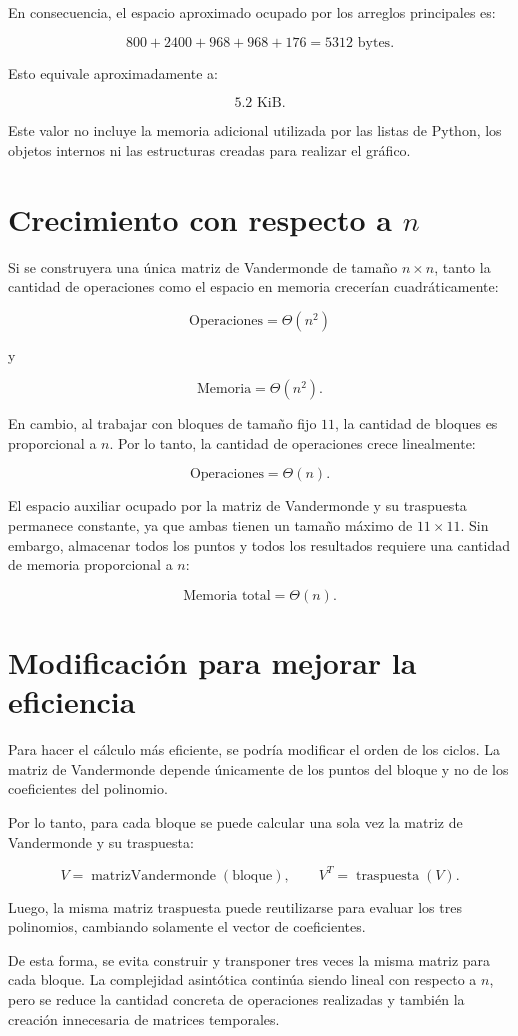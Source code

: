 \documentclass[12pt,a4paper]{article}
\begin{document}
En consecuencia, el espacio aproximado ocupado por los arreglos principales es:

\[
800+2400+968+968+176
=
\boxed{5312\text{ bytes}}.
\]

Esto equivale aproximadamente a:

\[
\boxed{5.2\text{ KiB}}.
\]

Este valor no incluye la memoria adicional utilizada por las listas de Python, los objetos internos ni las estructuras creadas para realizar el gráfico.

\section*{Crecimiento con respecto a \texorpdfstring{$n$}{n}}

Si se construyera una única matriz de Vandermonde de tamaño $n\times n$, tanto la cantidad de operaciones como el espacio en memoria crecerían cuadráticamente:

\[
\boxed{\text{Operaciones}=\Theta(n^2)}
\]

y

\[
\boxed{\text{Memoria}=\Theta(n^2)}.
\]

En cambio, al trabajar con bloques de tamaño fijo $11$, la cantidad de bloques es proporcional a $n$. Por lo tanto, la cantidad de operaciones crece linealmente:

\[
\boxed{\text{Operaciones}=\Theta(n)}.
\]

El espacio auxiliar ocupado por la matriz de Vandermonde y su traspuesta permanece constante, ya que ambas tienen un tamaño máximo de $11\times11$. Sin embargo, almacenar todos los puntos y todos los resultados requiere una cantidad de memoria proporcional a $n$:

\[
\boxed{\text{Memoria total}=\Theta(n)}.
\]

\section*{Modificación para mejorar la eficiencia}

Para hacer el cálculo más eficiente, se podría modificar el orden de los ciclos. La matriz de Vandermonde depende únicamente de los puntos del bloque y no de los coeficientes del polinomio.

Por lo tanto, para cada bloque se puede calcular una sola vez la matriz de Vandermonde y su traspuesta:

\[
V=\operatorname{matrizVandermonde}(\text{bloque}),
\qquad
V^T=\operatorname{traspuesta}(V).
\]

Luego, la misma matriz traspuesta puede reutilizarse para evaluar los tres polinomios, cambiando solamente el vector de coeficientes.

De esta forma, se evita construir y transponer tres veces la misma matriz para cada bloque. La complejidad asintótica continúa siendo lineal con respecto a $n$, pero se reduce la cantidad concreta de operaciones realizadas y también la creación innecesaria de matrices temporales.
\end{document}
